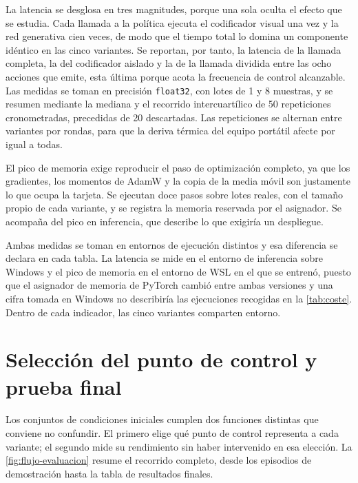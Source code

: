 La latencia se desglosa en tres magnitudes, porque una sola oculta el efecto que se
estudia. Cada llamada a la pol\'itica ejecuta el codificador visual una vez y la red
generativa cien veces, de modo que el tiempo total lo domina un componente id\'entico en
las cinco variantes. Se reportan, por tanto, la latencia de la llamada completa, la del
codificador aislado y la de la llamada dividida entre las ocho acciones que emite, esta
\'ultima porque acota la frecuencia de control alcanzable. Las medidas se toman en
precisi\'on \texttt{float32}, con lotes de \num{1} y \num{8} muestras, y se resumen
mediante la mediana y el recorrido intercuart\'ilico de \num{50} repeticiones
cronometradas, precedidas de \num{20} descartadas. Las repeticiones se alternan entre
variantes por rondas, para que la deriva t\'ermica del equipo port\'atil afecte por igual
a todas.

El pico de memoria exige reproducir el paso de optimizaci\'on completo, ya que los
gradientes, los momentos de AdamW y la copia de la media m\'ovil son justamente lo que
ocupa la tarjeta. Se ejecutan doce pasos sobre lotes reales, con el tama\~no propio de cada
variante, y se registra la memoria reservada por el asignador. Se acompa\~na del pico en
inferencia, que describe lo que exigir\'ia un despliegue.

Ambas medidas se toman en entornos de ejecuci\'on distintos y esa diferencia se declara en
cada tabla. La latencia se mide en el entorno de inferencia sobre Windows y el pico de
memoria en el entorno de WSL en el que se entren\'o, puesto que el asignador de memoria de
PyTorch cambi\'o entre ambas versiones y una cifra tomada en Windows no describir\'ia las
ejecuciones recogidas en la \cref{tab:coste}. Dentro de cada indicador, las cinco variantes
comparten entorno.

\section{Selecci\'on del punto de control y prueba final}
\label{sec:seleccion-prueba}

Los conjuntos de condiciones iniciales cumplen dos funciones distintas que conviene no
confundir. El primero elige qu\'e punto de control representa a cada variante; el segundo
mide su rendimiento sin haber intervenido en esa elecci\'on. La
\cref{fig:flujo-evaluacion} resume el recorrido completo, desde los episodios de
demostraci\'on hasta la tabla de resultados finales.

